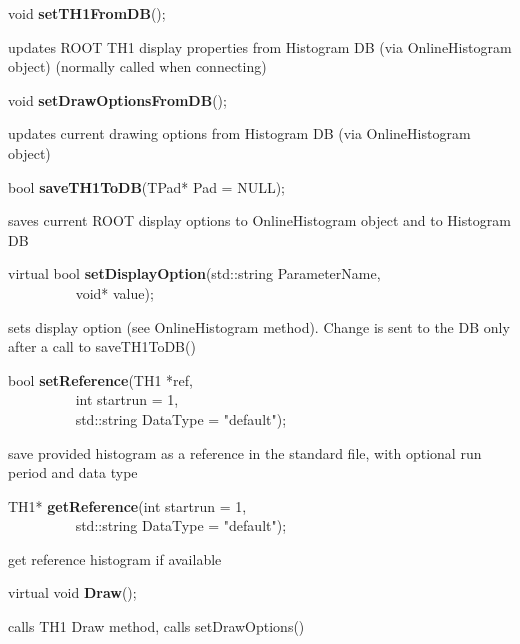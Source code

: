 \item    void {\bf setTH1FromDB}();


 updates ROOT TH1 display properties from Histogram DB (via OnlineHistogram object) 
 (normally called when connecting)


\item    void {\bf setDrawOptionsFromDB}();


 updates current drawing options from Histogram DB (via OnlineHistogram object)


\item    bool {\bf saveTH1ToDB}(TPad* Pad = NULL);


 saves current ROOT display options to OnlineHistogram object and to Histogram DB


\item    virtual bool {\bf setDisplayOption}(std::string ParameterName,\\\mbox{}~~~~~~~~~ 
				void* value);

 sets display option (see OnlineHistogram method). Change is sent to the DB only 
 after a call to saveTH1ToDB()


\item    bool {\bf setReference}(TH1 *ref,\\\mbox{}~~~~~~~~~
		    int startrun = 1,\\\mbox{}~~~~~~~~~
		    std::string DataType = "default");

 save provided histogram as a reference in the standard file, with optional run period and data type


\item    TH1* {\bf getReference}(int startrun = 1,\\\mbox{}~~~~~~~~~
		    std::string DataType = "default");

 get reference histogram if available


\item    virtual void {\bf Draw}();


 calls TH1 Draw method, calls setDrawOptions()



